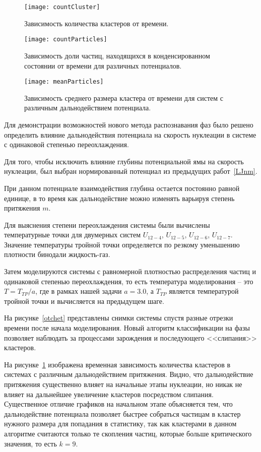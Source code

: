 \begin{figure}[!t]
  \centering
  \texttt{[image: countCluster]}
  \caption{Зависимость количества кластеров от времени.}
  \label{countCluster}
\end{figure}

\begin{figure}[!t]
  \centering
  \texttt{[image: countParticles]}
  \caption{Зависимость доли частиц, находящихся в конденсированном состоянии от времени для различных потенциалов.}
  \label{countParticles}
\end{figure}

\begin{figure}[!t]
  \centering
  \texttt{[image: meanParticles]}
  \caption{Зависимость среднего размера кластера от времени для систем с различным дальнодействием потенциала.}
  \label{meanParticles}
\end{figure}

Для демонстрации возможностей нового метода распознавания фаз было решено определить влияние дальнодействия потенциала на скорость нуклеации в системе с одинаковой степенью переохлаждения.

Для того, чтобы исключить влияние глубины потенциальной ямы на скорость нуклеации, был выбран нормированный потенциал из предыдущих работ~\ref{LJnm}.

При данном потенциале взаимодействия глубина остается постоянно равной единице, в то время как дальнодействие можно изменять варьируя степень притяжения $m$.

Для выяснения степени переохлаждения системы были вычислены температурные точки для двумерных систем $U_{12-4}$, $U_{12-5}$, $U_{12-6}$, $U_{12-7}$.
Значение температуры тройной точки определяется по резкому уменьшению плотности бинодали жидкость-газ.

Затем моделируются системы с равномерной плотностью распределения частиц и одинаковой степенью переохлаждения, то есть температура моделирования -- это $T = T_{TP} / a$, где в рамках нашей задачи $a = 3.0$, а $T_{TP}$ является температурой тройной точки и вычисляется на предыдущем шаге.

На рисунке~\ref{otchet} представлены снимки системы спустя разные отрезки времени после начала моделирования.
Новый алгоритм классификации на фазы позволяет наблюдать за процессами зарождения и последующего <<слипания>> кластеров.


На рисунке~\ref{countCluster} изображена временная зависимость количества кластеров в системах с различным дальнодействием притяжения. 
Видно, что дальнодействие притяжения существенно влияет на начальные этапы нуклеации, но никак не влияет на дальнейшее увеличение кластеров посредством слипания.
Существенное отличие графиков на начальном этапе объясняется тем, что дальнодействие потенциала позволяет быстрее собраться частицам в кластер нужного размера для попадания в статистику, так как кластерами в данном алгоритме считаются только те скопления частиц, которые больше критического значения, то есть $k = 9$.


